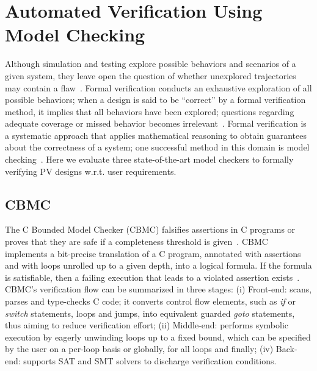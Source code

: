 \documentclass[review]{elsarticle}
\begin{document}
\section{Automated Verification Using Model Checking}
\label{sec:AutomatedVerification}
Although simulation and testing explore possible behaviors and scenarios of a given system, they leave open the question of whether unexplored trajectories may contain a flaw~\citep{ClarkeHV18}. Formal verification conducts an exhaustive exploration of all possible behaviors; when a design is said to be ``correct'' by a formal verification method, it implies that all behaviors have been explored; questions regarding adequate coverage or missed behavior becomes irrelevant~\citep{Clarke2012}. Formal verification is a systematic approach that applies mathematical reasoning to obtain guarantees about the correctness of a system; one successful method in this domain is model checking~\citep{Clarke2012}. Here we evaluate three state-of-the-art model checkers to formally verifying PV designs w.r.t. user requirements.

\subsection{CBMC}
The C Bounded Model Checker (CBMC) falsifies assertions in C programs or proves that they are safe if a completeness threshold is given~\citep{Kroening}. CBMC implements a bit-precise translation of a C program, annotated with assertions and with loops unrolled up to a given depth, into a logical formula. If the formula is satisfiable, then a failing execution that leads to a violated assertion exists~\citep{Kroening}. CBMC's verification flow can be summarized in three stages: (i) Front-end: scans, parses and type-checks C code; it converts control flow elements, such as \textit{if} or \textit{switch} statements, loops and jumps, into equivalent guarded \textit{goto} statements, thus aiming to reduce verification effort; (ii) Middle-end: performs symbolic execution by eagerly unwinding loops up to a fixed bound, which can be specified by the user on a per-loop basis or globally, for all loops and finally; (iv) Back-end: supports SAT and SMT solvers to discharge verification conditions.

\end{document}
